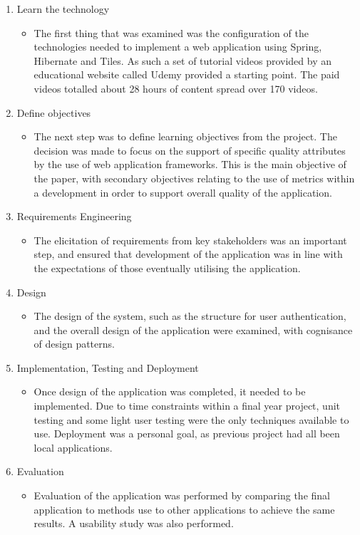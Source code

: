 \begin{enumerate}
\item Learn the technology
\begin{itemize}
\item The first thing that was examined was the configuration of the technologies needed to implement a web application using Spring, Hibernate and Tiles. As such a set of tutorial videos provided by an educational website called Udemy provided a starting point. The paid videos totalled about 28 hours of content spread over 170 videos.\parencite{udemy}
\end{itemize}
\item Define objectives
\begin{itemize}
\item The next step was to define learning objectives from the project. The decision was made to focus on the support of specific quality attributes by the use of web application frameworks. This is the main objective of the paper, with secondary objectives relating to the use of metrics within a development in order to support overall quality of the application.
\end{itemize}
\item Requirements Engineering
\begin{itemize}
\item The elicitation of requirements from key stakeholders was an important step, and ensured that development of the application was in line with the expectations of those eventually utilising the application.
\end{itemize}
\item Design
\begin{itemize}
\item The design of the system, such as the structure for user authentication, and the overall design of the application were examined, with cognisance of design patterns.
\end{itemize}
\item Implementation, Testing and Deployment
\begin{itemize}
\item Once design of the application was completed, it needed to be implemented. Due to time constraints within a final year project, unit testing and some light user testing were the only techniques available to use. Deployment was a personal goal, as previous project had all been local applications.
\end{itemize}
\item Evaluation
\begin{itemize}
\item Evaluation of the application was performed by comparing the final application to methods use to other applications to achieve the same results. A usability study was also performed.
\end{itemize}
\end{enumerate}